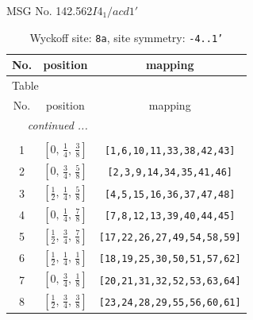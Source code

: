 \documentclass[fleqn,8pt]{jsarticle}
\begin{document}
\setcounter{MaxMatrixCols}{32}

\renewcommand{\tablename}{Table~}
\renewcommand{\figurename}{Figure~}
\begin{center}
\LARGE
MSG No. 142.562\quad$I4_{1}/acd1'$
\end{center}
\renewcommand{\arraystretch}{1.2}
\begin{longtable}{ccc}
\caption{Wyckoff site: {\tt 8a}, site symmetry: {\tt -4..1'}}
 \\
 \hline \hline
No. & position & mapping \\ \hline \endfirsthead

\multicolumn{2}{l}{\tablename\ \thetable{}} \\
 \hline \hline
No. & position & mapping \\ \hline \endhead

 \hline \hline
\multicolumn{2}{r}{\footnotesize\it continued ...} \\ \endfoot

 \hline \hline
\multicolumn{2}{r}{} \\ \endlastfoot

1 & $\left[ 0,\, \frac{1}{4},\, \frac{3}{8} \right]$ & {\tt [1,6,10,11,33,38,42,43]} \\ \hline
2 & $\left[ 0,\, \frac{3}{4},\, \frac{5}{8} \right]$ & {\tt [2,3,9,14,34,35,41,46]} \\ \hline
3 & $\left[ \frac{1}{2},\, \frac{1}{4},\, \frac{5}{8} \right]$ & {\tt [4,5,15,16,36,37,47,48]} \\ \hline
4 & $\left[ 0,\, \frac{1}{4},\, \frac{7}{8} \right]$ & {\tt [7,8,12,13,39,40,44,45]} \\ \hline
5 & $\left[ \frac{1}{2},\, \frac{3}{4},\, \frac{7}{8} \right]$ & {\tt [17,22,26,27,49,54,58,59]} \\ \hline
6 & $\left[ \frac{1}{2},\, \frac{1}{4},\, \frac{1}{8} \right]$ & {\tt [18,19,25,30,50,51,57,62]} \\ \hline
7 & $\left[ 0,\, \frac{3}{4},\, \frac{1}{8} \right]$ & {\tt [20,21,31,32,52,53,63,64]} \\ \hline
8 & $\left[ \frac{1}{2},\, \frac{3}{4},\, \frac{3}{8} \right]$ & {\tt [23,24,28,29,55,56,60,61]} \\
\end{longtable}
\renewcommand{\arraystretch}{1.2}
\end{document}
